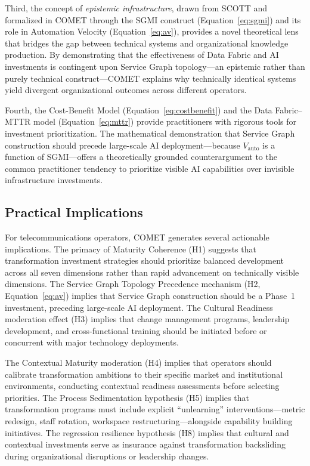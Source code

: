 \documentclass[12pt,a4paper]{article}
\begin{document}
Third, the concept of \textit{epistemic infrastructure}, drawn from SCOTT and formalized in COMET through the SGMI construct (Equation~\ref{eq:sgmi}) and its role in Automation Velocity (Equation~\ref{eq:av}), provides a novel theoretical lens that bridges the gap between technical systems and organizational knowledge production. By demonstrating that the effectiveness of Data Fabric and AI investments is contingent upon Service Graph topology---an epistemic rather than purely technical construct---COMET explains why technically identical systems yield divergent organizational outcomes across different operators.

Fourth, the Cost-Benefit Model (Equation~\ref{eq:costbenefit}) and the Data Fabric--MTTR model (Equation~\ref{eq:mttr}) provide practitioners with rigorous tools for investment prioritization. The mathematical demonstration that Service Graph construction should precede large-scale AI deployment---because $V_{\text{auto}}$ is a function of SGMI---offers a theoretically grounded counterargument to the common practitioner tendency to prioritize visible AI capabilities over invisible infrastructure investments.

\subsection{Practical Implications}

For telecommunications operators, COMET generates several actionable implications. The primacy of Maturity Coherence (H1) suggests that transformation investment strategies should prioritize balanced development across all seven dimensions rather than rapid advancement on technically visible dimensions. The Service Graph Topology Precedence mechanism (H2, Equation~\ref{eq:av}) implies that Service Graph construction should be a Phase~1 investment, preceding large-scale AI deployment. The Cultural Readiness moderation effect (H3) implies that change management programs, leadership development, and cross-functional training should be initiated before or concurrent with major technology deployments.

The Contextual Maturity moderation (H4) implies that operators should calibrate transformation ambitions to their specific market and institutional environments, conducting contextual readiness assessments before selecting priorities. The Process Sedimentation hypothesis (H5) implies that transformation programs must include explicit ``unlearning'' interventions---metric redesign, staff rotation, workspace restructuring---alongside capability building initiatives. The regression resilience hypothesis (H8) implies that cultural and contextual investments serve as insurance against transformation backsliding during organizational disruptions or leadership changes.
\end{document}
